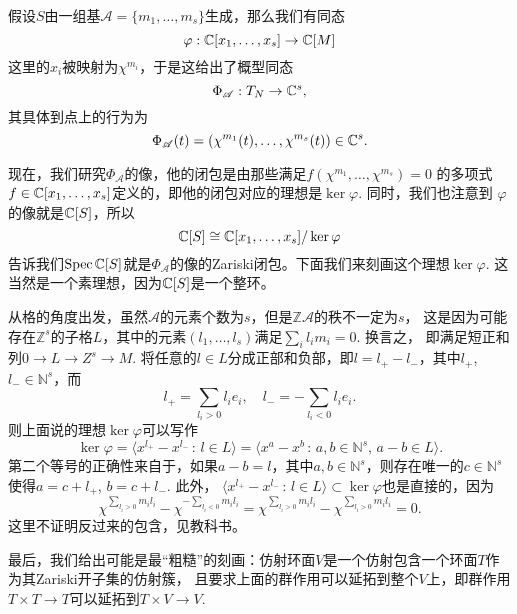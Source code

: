 假设$S$由一组基$\mathscr A=\{m_1,\dots,m_s\}$生成，那么我们有同态
\[
    \varphi:\mathbb{C}[x_1,\dots,x_s]\to \mathbb{C}[M]
\]
这里的$x_i$被映射为$\chi^{m_i}$，于是这给出了概型同态
\[
    \Phi_{\mathscr A}:T_N\to \mathbb{C}^s,
\]
其具体到点上的行为为
\[
    \Phi_{\mathscr A}(t)=(\chi^{m_1}(t),\dots,\chi^{m_s}(t))\in \mathbb{C}^s.
\]

现在，我们研究$\Phi_{\mathscr A}$的像，他的闭包是由那些满足$f(\chi^{m_1},\dots,\chi^{m_s})=0$
的多项式$f\in \mathbb{C}[x_1,\dots,x_s]$定义的，即他的闭包对应的理想是$\ker\varphi$. 同时，我们也注意到
$\varphi$的像就是$\mathbb{C}[S]$，所以
\[
    \mathbb{C}[S]\cong \mathbb{C}[x_1,\dots,x_s]/\ker \varphi
\]
告诉我们$\operatorname{Spec} \mathbb{C}[S]$就是$\Phi_{\mathscr A}$的像的Zariski闭包。下面我们来刻画这个理想$\ker\varphi$.
这当然是一个素理想，因为$\mathbb{C}[S]$是一个整环。

从格的角度出发，虽然$\mathscr A$的元素个数为$s$，但是$\mathbb Z\mathscr A$的秩不一定为$s$，
这是因为可能存在$\mathbb Z^s$的子格$L$，其中的元素$(l_1,\dots,l_s)$满足$\sum_i l_im_i=0$. 换言之，
即满足短正和列$0\to L\to Z^s\to M$. 将任意的$l\in L$分成正部和负部，即$l=l_+-l_-$，其中$l_+$, $l_-\in \mathbb N^s$，而
\[
    l_+=\sum_{l_i>0}l_ie_i,\quad l_-=-\sum_{l_i<0}l_ie_i.
\]
则上面说的理想$\ker \varphi$可以写作
\[
    \ker\varphi=\langle x^{l_+}-x^{l_-}\,:\, l\in L\rangle=
    \langle x^{a}-x^{b}\,:\, a,b\in \mathbb N^s,\, a-b\in L\rangle.
\]
第二个等号的正确性来自于，如果$a-b=l$，其中$a,b\in \mathbb N^s$，则存在唯一的$c\in \mathbb N^s$
使得$a=c+l_+$, $b=c+l_-$. 此外，
$\langle x^{l_+}-x^{l_-}\,:\, l\in L\rangle\subset \ker\varphi$也是直接的，因为
\[
    \chi^{\sum_{l_i>0} m_il_i}-\chi^{-\sum_{l_i<0} m_il_i}=
    \chi^{\sum_{l_i>0} m_il_i}-\chi^{\sum_{l_i>0} m_il_i}=0.
\]
这里不证明反过来的包含，见教科书。

最后，我们给出可能是最“粗糙”的刻画：仿射环面$V$是一个仿射包含一个环面$T$作为其Zariski开子集的仿射簇，
且要求上面的群作用可以延拓到整个$V$上，即群作用$T\times T\to T$可以延拓到$T\times V\to V$.

